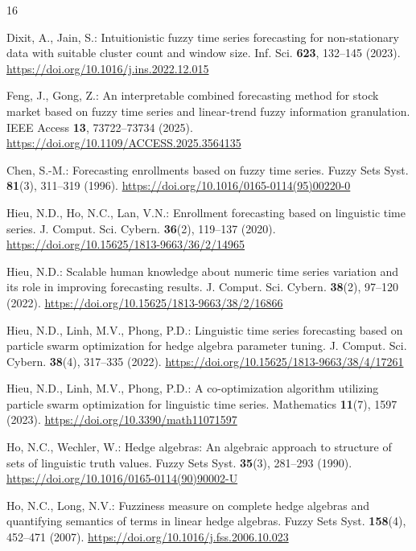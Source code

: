 \documentclass{llncs}
\begin{document}
\begin{thebibliography}{16}

Dixit, A., Jain, S.: Intuitionistic fuzzy time series forecasting for
non-stationary data with suitable cluster count and window size.
Inf. Sci. \textbf{623}, 132--145 (2023).
\url{https://doi.org/10.1016/j.ins.2022.12.015}

Feng, J., Gong, Z.: An interpretable combined forecasting method for
stock market based on fuzzy time series and linear-trend fuzzy
information granulation.
IEEE Access \textbf{13}, 73722--73734 (2025).
\url{https://doi.org/10.1109/ACCESS.2025.3564135}

Chen, S.-M.: Forecasting enrollments based on fuzzy time series.
Fuzzy Sets Syst. \textbf{81}(3), 311--319 (1996).
\url{https://doi.org/10.1016/0165-0114(95)00220-0}

Hieu, N.D., Ho, N.C., Lan, V.N.: Enrollment forecasting based on
linguistic time series. J. Comput. Sci. Cybern. \textbf{36}(2),
119--137 (2020).
\url{https://doi.org/10.15625/1813-9663/36/2/14965}

Hieu, N.D.: Scalable human knowledge about numeric time series
variation and its role in improving forecasting results.
J. Comput. Sci. Cybern. \textbf{38}(2), 97--120 (2022).
\url{https://doi.org/10.15625/1813-9663/38/2/16866}

Hieu, N.D., Linh, M.V., Phong, P.D.: Linguistic time series
forecasting based on particle swarm optimization for hedge algebra
parameter tuning. J. Comput. Sci. Cybern. \textbf{38}(4), 317--335
(2022). \url{https://doi.org/10.15625/1813-9663/38/4/17261}

Hieu, N.D., Linh, M.V., Phong, P.D.: A co-optimization algorithm
utilizing particle swarm optimization for linguistic time series.
Mathematics \textbf{11}(7), 1597 (2023).
\url{https://doi.org/10.3390/math11071597}

Ho, N.C., Wechler, W.: Hedge algebras: An algebraic approach to
structure of sets of linguistic truth values.
Fuzzy Sets Syst. \textbf{35}(3), 281--293 (1990).
\url{https://doi.org/10.1016/0165-0114(90)90002-U}

Ho, N.C., Long, N.V.: Fuzziness measure on complete hedge algebras
and quantifying semantics of terms in linear hedge algebras.
Fuzzy Sets Syst. \textbf{158}(4), 452--471 (2007).
\url{https://doi.org/10.1016/j.fss.2006.10.023}


\end{thebibliography}
\end{document}
